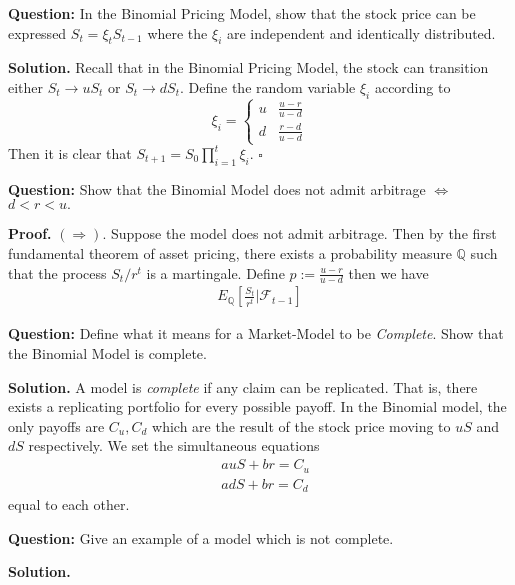 \documentclass{article}
\begin{document}
\begin{tcolorbox}[colframe=black,colback=gray!5,boxrule=0.5pt]
\textbf{Question:} In the Binomial Pricing Model, show that the stock price can be expressed $S_t = \xi_tS_{t-1}$ where the $\xi_i$ are independent and identically distributed.   \cite{Fima}
\end{tcolorbox}
\textbf{Solution.}
Recall that in the Binomial Pricing Model, the stock can transition either $S_{t} \to uS_t$ or $S_t \to dS_t$. Define the random variable $\xi_i$ according to 
\[ \xi_i = \begin{cases} 
      u & \frac{u-r}{u-d} \\
      d & \frac{r-d}{u-d}
   \end{cases}
\]
Then it is clear that $S_{t+1} = S_0\prod_{i=1}^{t}\xi_i$. $\square$

\begin{tcolorbox}[colframe=black,colback=gray!5,boxrule=0.5pt]
\textbf{Question:} Show that the Binomial Model does not admit arbitrage $\iff$ $d<r<u.$
\end{tcolorbox}
\textbf{Proof.}
$(\Rightarrow)$. Suppose the model does not admit arbitrage. Then by the first fundamental theorem of asset pricing, there exists a probability measure $\mathbb{Q}$ such that the process $S_t / r^t$ is a martingale. Define $p:= \frac{u-r}{u-d}$ then we have 
\begin{align*}
    E_\mathbb{Q}\left[\frac{S_t}{r^t} | \mathcal{F}_{t-1}\right]
\end{align*}
 
\begin{tcolorbox}[colframe=black,colback=gray!5,boxrule=0.5pt]
\textbf{Question:} Define what it means for a Market-Model to be \textit{Complete}. Show that the Binomial Model is complete. 
\end{tcolorbox}
\textbf{Solution.} A model is \textit{complete} if any claim can be replicated. That is, there exists a replicating portfolio for every possible payoff. In the Binomial model, the only payoffs are $C_u, C_d$ which are the result of the stock price moving to $uS$ and $dS$ respectively. We set the simultaneous equations 
\begin{align*}
    & auS + br = C_u \\
    & adS + br = C_d
\end{align*}
equal to each other.


\begin{tcolorbox}[colframe=black,colback=gray!5,boxrule=0.5pt]
\textbf{Question:} Give an example of a model which is not complete. 
\end{tcolorbox}
\textbf{Solution.}
\end{document}
